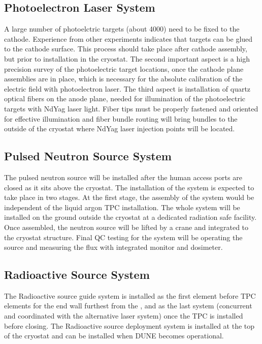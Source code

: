 \subsection{Photoelectron Laser System} 
A large number of photoelctric targets (about 4000) need to be fixed to the cathode. Experience from other experiments indicates that targets can be glued to the cathode surface. This process should take place after cathode assembly, but prior to installation in the cryostat. 
The second important aspect is a high precision survey of the photoelectric target locations, once the cathode plane assemblies are in place, which is necessary for the absolute calibration of the electric field with photoelectron laser. 
The third aspect is installation of quartz optical fibers on the anode plane, needed for illumination of the photoelectric targets with NdYag laser light. Fiber tips must be properly fastened and oriented for effective illumination and fiber bundle routing will bring bundles to the outside of the cryostat where NdYag laser injection points will be located. 

\subsection{Pulsed Neutron Source System} 
The pulsed neutron source will be installed after the human access ports are closed as it sits above the cryostat. The installation of the system is expected to take place in two stages. At the first stage, the assembly of the system would be independent of the liquid argon TPC installation. The whole system will be installed on the ground outside the cryostat at a dedicated radiation safe facility. Once assembled, the neutron source will be lifted by a crane and integrated to the cryostat structure. Final QC testing for the system will be operating the source and measuring the flux with integrated monitor and dosimeter.

\subsection{Radioactive Source System}
The Radioactive source guide system is installed as the first element before TPC elements for the end wall furthest from the , and as the last system (concurrent and coordinated with the alternative laser system) once the TPC is installed before  closing. The Radioactive source deployment system is installed at the top of the cryostat and can be installed when DUNE becomes operational.%

